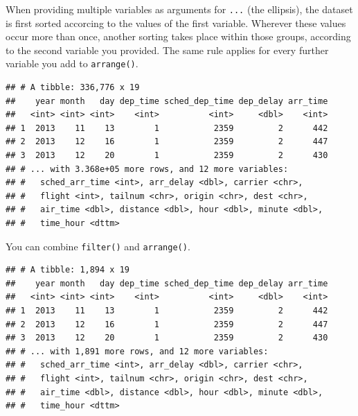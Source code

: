 \documentclass[]{book}
\newenvironment{Shaded}{}{}
\newcommand{\DecValTok}[1]{#1}
\newcommand{\KeywordTok}[1]{\textcolor[rgb]{0.00,0.00,1.00}{#1}}
\newcommand{\NormalTok}[1]{#1}
\newcommand{\OperatorTok}[1]{#1}
\newcommand{\StringTok}[1]{\textcolor[rgb]{0.00,0.50,0.50}{#1}}
\begin{document}
When providing multiple variables as arguments for \texttt{...} (the ellipsis), the dataset is first sorted accorcing to the values of the first variable.
Wherever these values occur more than once, another sorting takes place within those groups, according to the second variable you provided.
The same rule applies for every further variable you add to \texttt{arrange()}.

\begin{Shaded}
\end{Shaded}

\begin{verbatim}
## # A tibble: 336,776 x 19
##    year month   day dep_time sched_dep_time dep_delay arr_time
##   <int> <int> <int>    <int>          <int>     <dbl>    <int>
## 1  2013    11    13        1           2359         2      442
## 2  2013    12    16        1           2359         2      447
## 3  2013    12    20        1           2359         2      430
## # ... with 3.368e+05 more rows, and 12 more variables:
## #   sched_arr_time <int>, arr_delay <dbl>, carrier <chr>,
## #   flight <int>, tailnum <chr>, origin <chr>, dest <chr>,
## #   air_time <dbl>, distance <dbl>, hour <dbl>, minute <dbl>,
## #   time_hour <dttm>
\end{verbatim}

You can combine \texttt{filter()} and \texttt{arrange()}.

\begin{Shaded}
\end{Shaded}

\begin{verbatim}
## # A tibble: 1,894 x 19
##    year month   day dep_time sched_dep_time dep_delay arr_time
##   <int> <int> <int>    <int>          <int>     <dbl>    <int>
## 1  2013    11    13        1           2359         2      442
## 2  2013    12    16        1           2359         2      447
## 3  2013    12    20        1           2359         2      430
## # ... with 1,891 more rows, and 12 more variables:
## #   sched_arr_time <int>, arr_delay <dbl>, carrier <chr>,
## #   flight <int>, tailnum <chr>, origin <chr>, dest <chr>,
## #   air_time <dbl>, distance <dbl>, hour <dbl>, minute <dbl>,
## #   time_hour <dttm>
\end{verbatim}
\end{document}
